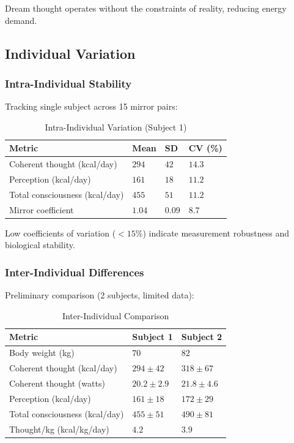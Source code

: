 \documentclass[12pt]{article}
\theoremstyle{remark}
\begin{document}
Dream thought operates without the constraints of reality, reducing energy demand.

\subsection{Individual Variation}

\subsubsection{Intra-Individual Stability}

Tracking single subject across 15 mirror pairs:

\begin{table}[H]
\centering
\caption{Intra-Individual Variation (Subject 1)}
\begin{tabular}{@{}llll@{}}
\toprule
\textbf{Metric} & \textbf{Mean} & \textbf{SD} & \textbf{CV (\%)} \\
\midrule
Coherent thought (kcal/day) & $294$ & $42$ & $14.3$ \\
Perception (kcal/day) & $161$ & $18$ & $11.2$ \\
Total consciousness (kcal/day) & $455$ & $51$ & $11.2$ \\
Mirror coefficient & $1.04$ & $0.09$ & $8.7$ \\
\bottomrule
\end{tabular}
\end{table}

Low coefficients of variation ($<15\%$) indicate measurement robustness and biological stability.

\subsubsection{Inter-Individual Differences}

Preliminary comparison (2 subjects, limited data):

\begin{table}[H]
\centering
\caption{Inter-Individual Comparison}
\begin{tabular}{@{}lll@{}}
\toprule
\textbf{Metric} & \textbf{Subject 1} & \textbf{Subject 2} \\
\midrule
Body weight (kg) & $70$ & $82$ \\
Coherent thought (kcal/day) & $294 \pm 42$ & $318 \pm 67$ \\
Coherent thought (watts) & $20.2 \pm 2.9$ & $21.8 \pm 4.6$ \\
Perception (kcal/day) & $161 \pm 18$ & $172 \pm 29$ \\
Total consciousness (kcal/day) & $455 \pm 51$ & $490 \pm 81$ \\
\midrule
Thought/kg (kcal/kg/day) & $4.2$ & $3.9$ \\
\bottomrule
\end{tabular}
\end{table}
\end{document}

